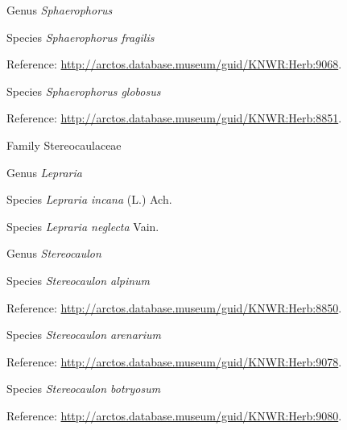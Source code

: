 \documentclass[9pt, article]{memoir}
\begin{document}
\begin{multicols}{2}
\vspace{6pt}\noindent\hspace{30pt}Genus \textit{Sphaerophorus}


\vspace{6pt}\noindent\hspace{36pt}Species \textit{Sphaerophorus fragilis}


Reference: 
\url{http://arctos.database.museum/guid/KNWR:Herb:9068}.

\vspace{6pt}\noindent\hspace{36pt}Species \textit{Sphaerophorus globosus}


Reference: 
\url{http://arctos.database.museum/guid/KNWR:Herb:8851}.

\vspace{6pt}\noindent\hspace{24pt}Family Stereocaulaceae


\vspace{6pt}\noindent\hspace{30pt}Genus \textit{Lepraria}


\vspace{6pt}\noindent\hspace{36pt}Species \textit{Lepraria incana} (L.) Ach.


\vspace{6pt}\noindent\hspace{36pt}Species \textit{Lepraria neglecta} Vain.


\vspace{6pt}\noindent\hspace{30pt}Genus \textit{Stereocaulon}


\vspace{6pt}\noindent\hspace{36pt}Species \textit{Stereocaulon alpinum}


Reference: 
\url{http://arctos.database.museum/guid/KNWR:Herb:8850}.

\vspace{6pt}\noindent\hspace{36pt}Species \textit{Stereocaulon arenarium}


Reference: 
\url{http://arctos.database.museum/guid/KNWR:Herb:9078}.

\vspace{6pt}\noindent\hspace{36pt}Species \textit{Stereocaulon botryosum}


Reference: 
\url{http://arctos.database.museum/guid/KNWR:Herb:9080}.


\end{multicols}
\end{document}
